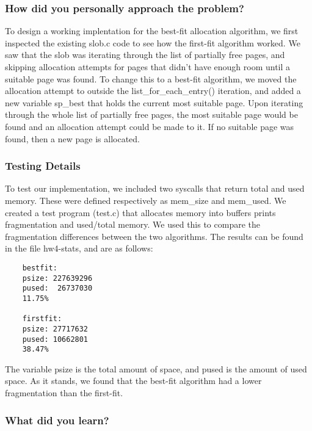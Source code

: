\documentclass[journal, letterpaper, draftclsnofoot, onecolumn, 10pt]{IEEEtran}
\begin{document}
\subsubsection{How did you personally approach the problem?}



To design a working implentation for the best-fit allocation algorithm, we first inspected the existing slob.c code to see how the first-fit algorithm worked.
We saw that the slob was iterating through the list of partially free pages, and skipping allocation attempts for pages that didn't have enough room until a suitable page was found.
To change this to a best-fit algorithm, we moved the allocation attempt to outside the list\_for\_each\_entry() iteration, and added a new variable sp\_best that holds the current most suitable page.
Upon iterating through the whole list of partially free pages, the most suitable page would be found and an allocation attempt could be made to it. If no suitable page was found, then a new page is allocated. \\


\subsubsection{Testing Details}

To test our implementation, we included two syscalls that return total and used memory. These were defined respectively as mem\_size and mem\_used.
We created a test program (test.c) that allocates memory into buffers prints fragmentation and used/total memory. We used this to compare the fragmentation differences between the two algorithms.
The results can be found in the file hw4-stats, and are as follows: \\
\clearpage
\begin{verbatim}
    bestfit:
    psize: 227639296
    pused:  26737030
    11.75%

    firstfit:
    psize: 27717632
    pused: 10662801
    38.47%
\end{verbatim}

The variable psize is the total amount of space, and pused is the amount of used space. As it stands, we found that the best-fit algorithm had a lower fragmentation than the first-fit.

\subsubsection{What did you learn?}
\end{document}
